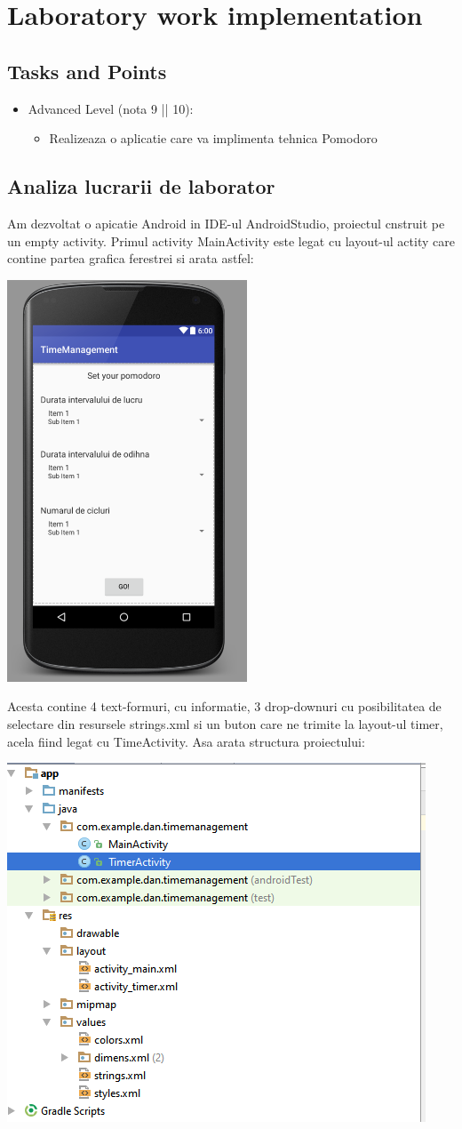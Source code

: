 \section{Laboratory work implementation}

\subsection{Tasks and Points}

\begin{itemize}
	\item Advanced Level (nota 9 || 10):
	\begin{itemize}
		\item Realizeaza o aplicatie care va implimenta tehnica Pomodoro
	\end{itemize}
\end{itemize}

\subsection{Analiza lucrarii de laborator}

Am dezvoltat o apicatie Android in IDE-ul AndroidStudio, proiectul cnstruit pe un empty activity.
Primul activity MainActivity este legat cu layout-ul actity care contine partea grafica ferestrei si arata astfel:


\begin{center}
\includegraphics[width=0.3\linewidth]{img1}
\end{center}

Acesta contine 4 text-formuri, cu informatie, 3 drop-downuri cu posibilitatea de selectare din resursele strings.xml si un buton care ne trimite la layout-ul timer, acela fiind legat cu TimeActivity. Asa arata structura proiectului:

\begin{center}
\includegraphics[width=0.5\linewidth]{img2}
\end{center}

